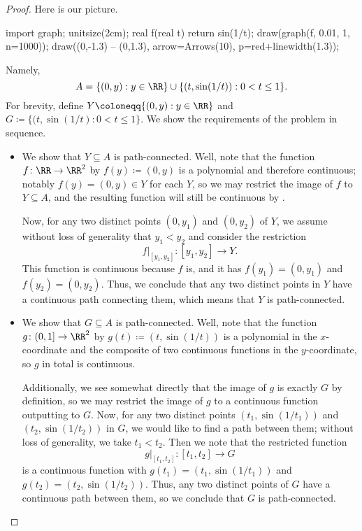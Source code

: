\documentclass[../notes.tex]{subfiles}
\begin{document}
\begin{proof}
	Here is our picture.
	\begin{center}
		\begin{asy}
			import graph;
			unitsize(2cm);
			real f(real t)
			{
				return sin(1/t);
			}
			draw(graph(f, 0.01, 1, n=1000));
			draw((0,-1.3) -- (0,1.3), arrow=Arrows(10), p=red+linewidth(1.3));
		\end{asy}
	\end{center}
	Namely,
	\[A=\{(0,y):y\in\RR\}\cup\{(t,\sin(1/t)):0<t\le1\}.\]
	For brevity, define $Y\coloneqq\{(0,y):y\in\RR\}$ and $G\coloneqq\{(t,\sin(1/t):0<t\le1\}$. We show the requirements of the problem in sequence.
	\begin{itemize}
		\item We show that $Y\subseteq A$ is path-connected. Well, note that the function $f\colon\RR\to\RR^2$ by $f(y)\coloneqq(0,y)$ is a polynomial and therefore continuous; notably $f(y)=(0,y)\in Y$ for each $Y$, so we may restrict the image of $f$ to $Y\subseteq A$, and the resulting function will still be continuous by .
		
		Now, for any two distinct points $(0,y_1)$ and $(0,y_2)$ of $Y$, we assume without loss of generality that $y_1<y_2$ and consider the restriction
		\[f|_{[y_1,y_2]}\colon[y_1,y_2]\to Y.\]
		This function is continuous because $f$ is, and it has $f(y_1)=(0,y_1)$ and $f(y_2)=(0,y_2)$. Thus, we conclude that any two distinct points in $Y$ have a continuous path connecting them, which means that $Y$ is path-connected.
		\item We show that $G\subseteq A$ is path-connected. Well, note that the function $g\colon(0,1]\to\RR^2$ by $g(t)\coloneqq(t,\sin(1/t))$ is a polynomial in the $x$-coordinate and the composite of two continuous functions in the $y$-coordinate, so $g$ in total is continuous.

		Additionally, we see somewhat directly that the image of $g$ is exactly $G$ by definition, so we may restrict the image of $g$ to a continuous function outputting to $G$. Now, for any two distinct points $(t_1,\sin(1/t_1))$ and $(t_2,\sin(1/t_2))$ in $G$, we would like to find a path between them; without loss of generality, we take $t_1<t_2$. Then we note that the restricted function
		\[g|_{[t_1,t_2]}\colon[t_1,t_2]\to G\]
		is a continuous function with $g(t_1)=(t_1,\sin(1/t_1))$ and $g(t_2)=(t_2,\sin(1/t_2))$. Thus, any two distinct points of $G$ have a continuous path between them, so we conclude that $G$ is path-connected.


\end{itemize}
\end{proof}
\end{document}
